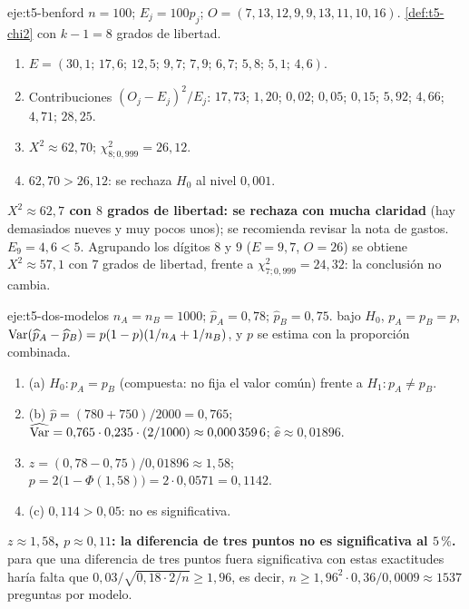 \begin{solucion}{eje:t5-benford}
\datos $n=100$; $E_j=100p_j$; $O=(7,13,12,9,9,13,11,10,16)$.
\planteamiento \cref{def:t5-chi2} con $k-1=8$ grados de libertad.
\pasos
\begin{enumerate}[label=\arabic*.]
  \item $E=(30{,}1;\allowbreak\,17{,}6;\allowbreak\,12{,}5;\allowbreak\,9{,}7;\allowbreak\,7{,}9;\allowbreak\,6{,}7;\allowbreak\,5{,}8;\allowbreak\,5{,}1;\allowbreak\,4{,}6)$.
  \item Contribuciones $(O_j-E_j)^{2}/E_j$: $17{,}73$; $1{,}20$; $0{,}02$; $0{,}05$; $0{,}15$; $5{,}92$; $4{,}66$; $4{,}71$; $28{,}25$.
  \item $X^{2}\approx62{,}70$; $\chi^{2}_{8;0{,}999}=26{,}12$.
  \item $62{,}70>26{,}12$: se rechaza $H_0$ al nivel $0{,}001$.
\end{enumerate}
\resultado \textbf{$X^{2}\approx62{,}7$ con $8$ grados de libertad: se rechaza con mucha claridad} (hay demasiados nueves y muy pocos unos); se recomienda revisar la nota de gastos.
\comprobacion $E_9=4{,}6<5$. Agrupando los dígitos $8$ y $9$ ($E=9{,}7$, $O=26$) se obtiene $X^{2}\approx57{,}1$ con $7$ grados de libertad, frente a $\chi^{2}_{7;0{,}999}=24{,}32$: la conclusión no cambia.
\end{solucion}

\begin{solucion}{eje:t5-dos-modelos}
\datos $n_A=n_B=1000$; $\widehat p_A=0{,}78$; $\widehat p_B=0{,}75$.
\planteamiento bajo $H_0$, $p_A=p_B=p$, $\operatorname{Var}(\widehat p_A-\widehat p_B)=p(1-p)(1/n_A+1/n_B)$, y $p$ se estima con la proporción combinada.
\pasos
\begin{enumerate}[label=\arabic*.]
  \item (a) $H_0:p_A=p_B$ (compuesta: no fija el valor común) frente a $H_1:p_A\ne p_B$.
  \item (b) $\widehat p=(780+750)/2000=0{,}765$; $\widehat{\operatorname{Var}}=0{,}765\cdot0{,}235\cdot(2/1000)\approx0{,}000\,359\,6$; $\widehat{\ee}\approx0{,}01896$.
  \item $z=(0{,}78-0{,}75)/0{,}01896\approx1{,}58$; $p=2\bigl(1-\Phi(1{,}58)\bigr)=2\cdot0{,}0571=0{,}1142$.
  \item (c) $0{,}114>0{,}05$: no es significativa.
\end{enumerate}
\resultado \textbf{$z\approx1{,}58$, $p\approx0{,}11$: la diferencia de tres puntos no es significativa al $5\,\%$.}
\comprobacion para que una diferencia de tres puntos fuera significativa con estas exactitudes haría falta que $0{,}03/\sqrt{0{,}18\cdot2/n}\ge1{,}96$, es decir, $n\ge1{,}96^{2}\cdot0{,}36/0{,}0009\approx1537$ preguntas por modelo.
\end{solucion}

